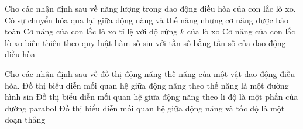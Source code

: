 \begin{ex}
Cho các nhận định sau về năng lượng trong dao động điều hòa của con lắc lò xo.
{\True Có sự chuyển hóa qua lại giữa động năng và thế năng nhưng cơ năng được bảo toàn}
{\True Cơ năng của con lắc lò xo tỉ lệ với độ cứng $k$ của lò xo}
{Cơ năng của con lắc lò xo biến thiên theo quy luật hàm số sin với tần số bằng tần số của dao động điều hòa}
\loigiai{
\begin{itemchoice}
\itemch
\itemch
\itemch
\itemch
\end{itemchoice}

}
\end{ex} 

\begin{ex}
Cho các nhận định sau về đồ thị động năng thế năng của một vật dao động điều hòa.
{Đồ thị biểu diễn mối quan hệ giữa động năng theo thế năng là một đường hình sin}
{\True Đồ thị biểu diễn mối quan hệ giữa động năng theo li độ là một phần của đường parabol}
{Đồ thị biểu diễn mối quan hệ giữa động năng và tốc độ là một đoạn thẳng}
\loigiai{
\begin{itemchoice}
\itemch
\itemch
\itemch
\itemch
\end{itemchoice}

}
\end{ex} 




